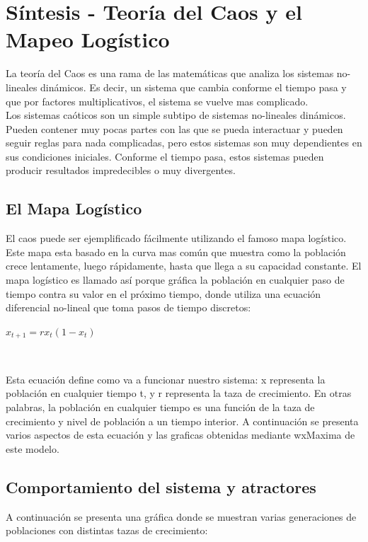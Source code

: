 \documentclass[12pt]{article}
\begin{document}
\section{Síntesis -  Teoría del Caos y el Mapeo Logístico}
La teoría del Caos es una rama de las matemáticas que analiza los sistemas no-lineales dinámicos. Es decir, un sistema que cambia conforme el tiempo pasa y que por factores multiplicativos, el sistema se vuelve mas complicado. \\

Los sistemas caóticos son un simple subtipo de sistemas no-lineales dinámicos. Pueden contener muy pocas partes con las que se pueda interactuar y pueden seguir reglas para nada complicadas, pero estos sistemas son muy dependientes en sus condiciones iniciales. Conforme el tiempo pasa, estos sistemas pueden producir resultados impredecibles o muy divergentes. 

\subsection{El Mapa Logístico}
El caos puede ser ejemplificado fácilmente utilizando el famoso mapa logístico. Este mapa esta basado en la curva mas común que muestra como la población crece lentamente, luego rápidamente, hasta que llega a su capacidad constante. El mapa logístico es llamado así porque gráfica la población en cualquier paso de tiempo contra su valor en el próximo tiempo, donde utiliza una ecuación diferencial no-lineal que toma pasos de tiempo discretos:

\centerline{$x_{t+1} = r x_t (1-x_t)$}
$     $

Esta ecuación define como va a funcionar nuestro sistema: x representa la población en cualquier tiempo t, y r representa la taza de crecimiento. En otras palabras, la población en cualquier tiempo es una función de la taza de crecimiento y nivel de población a un tiempo interior. A continuación se presenta varios aspectos de esta ecuación y las graficas obtenidas mediante wxMaxima de este modelo.

\subsection{Comportamiento del sistema y atractores}
A continuación se presenta una gráfica donde se muestran varias generaciones de poblaciones con distintas tazas de crecimiento:
\end{document}
